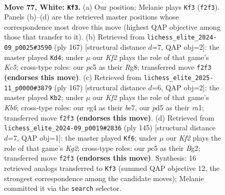 \documentclass[11pt]{article}
\begin{document}
\clearpage

\begin{figure}[p]\centering
\begin{subfigure}{0.46\textwidth}\centering
\resizebox{\linewidth}{!}{%
\newchessgame
\chessboard[
  setfen={8/4k3/8/2pp4/p5r1/8/5K2/8 w - - 10 77},
  showmover=false,
  pgfstyle=straightmove, color=movearrow, markmove={f2-f3}
]}
\caption{}
\end{subfigure}\hfill
\begin{subfigure}{0.46\textwidth}\centering
\resizebox{\linewidth}{!}{%
\newchessgame
\chessboard[
  setfen={6r1/8/5K2/8/2k5/R4P2/8/8 b - - 4 84},
  showmover=false,
  pgfstyle=straightmove, color=movearrow, markmove={c4-d4}
]}
\caption{}
\end{subfigure}
\\[4pt]
\begin{subfigure}{0.46\textwidth}\centering
\resizebox{\linewidth}{!}{%
\newchessgame
\chessboard[
  setfen={8/4B2P/8/8/7P/1k6/5K2/R7 b - - 0 84},
  showmover=false,
  pgfstyle=straightmove, color=movearrow, markmove={b3-b2}
]}
\caption{}
\end{subfigure}\hfill
\begin{subfigure}{0.46\textwidth}\centering
\resizebox{\linewidth}{!}{%
\newchessgame
\chessboard[
  setfen={1R6/6k1/1P1K4/8/8/8/6b1/8 b - - 8 73},
  showmover=false,
  pgfstyle=straightmove, color=movearrow, markmove={g7-f6}
]}
\caption{}
\end{subfigure}
\caption{\textbf{Move 77, White: \texttt{Kf3}.} (a) Our position; Melanie plays \texttt{Kf3} (\texttt{f2f3}). Panels (b)--(d) are the retrieved master positions whose correspondence most drove this move (highest QAP objective among those that transfer to it). (b) Retrieved from \texttt{lichess\_elite\_2024-09\_p0025\#3590} (ply 167) [structural distance $d$=7, QAP obj=2]: the master played \texttt{Kd4}; under $\mu$ our \emph{Kf2} plays the role of that game's \emph{Kc5}; cross-type roles: our \emph{p}c5 as their \emph{R}g8; transferred move \texttt{f2f3} \textbf{(endorses this move)}. (c) Retrieved from \texttt{lichess\_elite\_2025-11\_p0000\#3879} (ply 167) [structural distance $d$=6, QAP obj=2]: the master played \texttt{Kb2}; under $\mu$ our \emph{Kf2} plays the role of that game's \emph{Kb6}; cross-type roles: our \emph{r}g4 as their \emph{b}e7, our \emph{p}d5 as their \emph{r}a1; transferred move \texttt{f2f3} \textbf{(endorses this move)}. (d) Retrieved from \texttt{lichess\_elite\_2024-09\_p0019\#2836} (ply 145) [structural distance $d$=7, QAP obj=1]: the master played \texttt{Kf6}; under $\mu$ our \emph{Kf2} plays the role of that game's \emph{Kg2}; cross-type roles: our \emph{p}c5 as their \emph{B}g2; transferred move \texttt{f2f3} \textbf{(endorses this move)}. Synthesis: 16 retrieved analogs transferred to \texttt{Kf3} (summed QAP objective 12, the strongest correspondence among the candidate moves); Melanie committed it via the \texttt{search} selector.}
\label{fig:thought-m152}
\end{figure}
\end{document}
